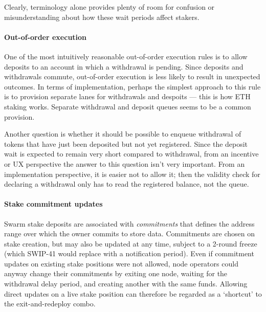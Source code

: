Clearly, terminology alone provides plenty of room for confusion or misunderstanding about how these wait periods affect stakers.

\paragraph{Out-of-order execution}
%
One of the most intuitively reasonable out-of-order execution rules is to allow deposits to an account in which a withdrawal is pending.
%
Since deposits and withdrawals commute, out-of-order execution is less likely to result in unexpected outcomes.
%
In terms of implementation, perhaps the simplest approach to this rule is to provision separate lanes for withdrawals and despoits — this is how ETH staking works.
%
Separate withdrawal and deposit queues seems to be a common provision.

Another question is whether it should be possible to enqueue withdrawal of tokens that have just been deposited but not yet registered. 
%
Since the deposit wait is expected to remain very short compared to withdrawal, from an incentive or UX perspective the answer to this question isn't very important.
%
From an implementation perspective, it is easier not to allow it; then the validity check for declaring a withdrawal only has to read the registered balance, not the queue.

\paragraph{Stake commitment updates}
%
Swarm stake deposits are associated with \emph{commitments} that defines the address range over which the owner commits to store data.
%
Commitments are chosen on stake creation, but may also be updated at any time, subject to a 2-round freeze (which SWIP-41 would replace with a notification period).
%
Even if commitment updates on existing stake positions were not allowed, node operators could anyway change their commitments by exiting one node, waiting for the withdrawal delay period, and creating another with the same funds.
%
Allowing direct updates on a live stake position can therefore be regarded as a `shortcut' to the exit-and-redeploy combo.

